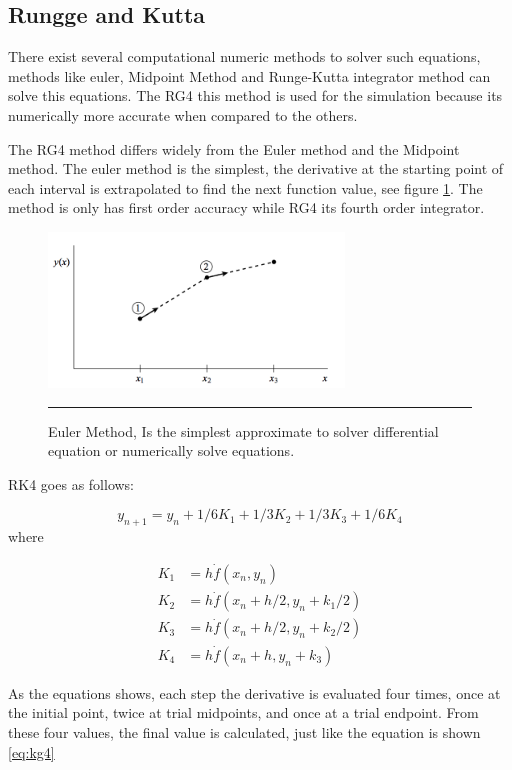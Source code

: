 \subsection{Rungge and Kutta}

There exist several computational numeric methods to solver such equations, methods like euler, Midpoint Method and Runge-Kutta integrator method can solve this equations. The RG4 this method is used for the simulation because its numerically more accurate when compared to the others.

The RG4 method differs widely from the Euler method and the Midpoint method. The euler method is the simplest, the derivative at the starting point of each interval is extrapolated to find the next function value, see figure \ref{fig:euler}. The method is only has first order accuracy while RG4 its fourth order integrator.

\begin{figure}[htbp]
	\centering
		\includegraphics[width=0.7\textwidth]{Figures/euler.png}
		\rule{35em}{0.5pt}
	\caption[Euler Method]{Euler Method, Is the simplest approximate to solver differential equation or numerically solve equations.}
	\label{fig:euler}
\end{figure}

RK4 goes as follows:

\begin{equation} \label{eq:kg4}
y_{n+1} = y_{n} + 1/6 K_{1} + 1/3 K_{2} +1/3 K_{3} + 1/6 K_{4} 
\end{equation}
where

\begin{align*}
K_{1} &= h \dot f(x_{n}, y_{n}) \\
K_{2} &= h \dot f(x_{n} + h/2, y_{n} + k_{1}/2) \\
K_{3} &= h \dot f(x_{n} + h/2, y_{n} + k_{2}/2) \\
K_{4} &= h \dot f(x_{n} + h, y_{n} + k_{3})
\end{align*}

As the equations shows, each step the derivative is evaluated four times, once at the initial point, twice at trial midpoints, and once at a trial endpoint. From these four values, the final value is calculated, just like the equation is shown \ref{eq:kg4}

